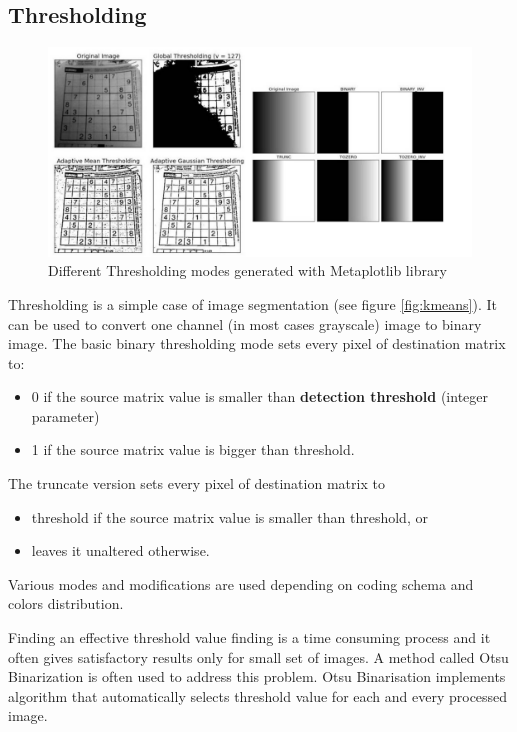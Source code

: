 \documentclass[12pt,twoside,a4paper]{article}
\begin{document}
\subsection{Thresholding}
\begin{figure}[H]
\centering
\includegraphics[width=0.8\paperwidth]{oneth}
\caption{Different Thresholding modes generated with Metaplotlib library}\label{fig:thr}
\end{figure}
Thresholding is a simple case of image segmentation (see figure \ref{fig:kmeans}).
It can be used to convert one channel (in most cases grayscale) image to binary image.
\newpage
The basic binary thresholding mode sets every pixel of destination matrix to:
\begin{itemize}
\item 0 if the source matrix value is smaller than \textbf{detection threshold} (integer parameter)
\item 1 if the source matrix value is bigger than threshold.
\end{itemize}
The truncate version sets every pixel of destination matrix to
\begin{itemize}
\item threshold if the source matrix value is smaller than threshold, or
\item leaves it unaltered otherwise.
\end{itemize}
Various modes and modifications are used depending on coding schema and colors distribution.
  



Finding an effective threshold value finding is a time consuming process and it often gives satisfactory results only for small set of images.
A method called Otsu Binarization is often used to address this problem. Otsu Binarisation implements algorithm that automatically selects threshold value for each and every processed image.
\end{document}
